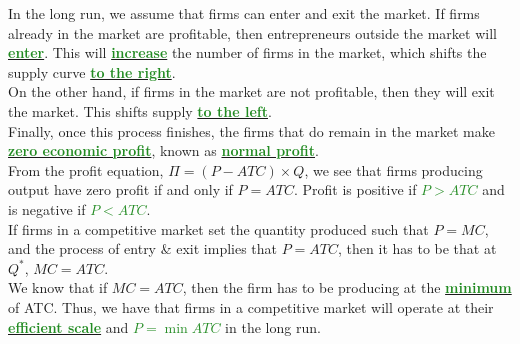 \documentclass[11pt]{article}\usepackage[]{graphicx}\usepackage[]{color}
\theoremstyle{definition}
\newcommand{\dd}[1]{{\underline{\textbf{\textcolor{ForestGreen}{#1}}}}}
\begin{document}
	In the long run, we assume that firms can enter and exit the market. If firms already in the market are profitable, then entrepreneurs outside the market will \dd{enter}. This will \dd{increase} the number of firms in the market, which shifts the supply curve \dd{to the right}. 
	\\
	
	On the other hand, if firms in the market are not profitable, then they will exit the market. This shifts supply \dd{to the left}. 
	\\
	
	Finally, once this process finishes, the firms that do remain in the market make \dd{zero economic profit}, known as \dd{normal profit}.
	\\
	
	From the profit equation, $\Pi = (P - ATC) \times Q$, we see that firms producing output have zero profit if and only if $P = ATC$. Profit is positive if \dd{$P>ATC$} and is negative if \dd{$P<ATC$}.
	\\
	
	If firms in a competitive market set the quantity produced such that $P = MC$, and the process of entry \& exit implies that $P = ATC$, then it has to be that at $Q^*$, $MC = ATC$. 
	\\
	
	We know that if $MC = ATC$, then the firm has to be producing at the \dd{minimum} of ATC. Thus, we have that firms in a competitive market will operate at their \dd{efficient scale} and \dd{$P = \min ATC$} in the long run.
	
\end{document}
